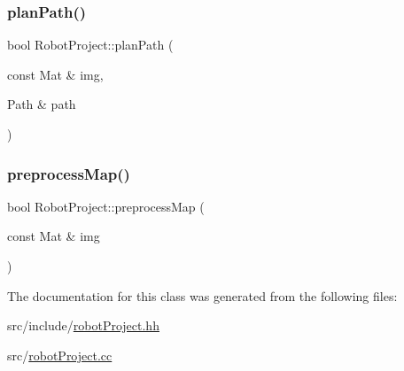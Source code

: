 \mbox{\label{class_robot_project_ad9077931a89d2226e6675c6107adfc53}} 
\subsubsection{\texorpdfstring{planPath()}{planPath()}}
{\footnotesize\ttfamily bool Robot\+Project\+::plan\+Path (\begin{DoxyParamCaption}\item[{const Mat \&}]{img,  }\item[{Path \&}]{path }\end{DoxyParamCaption})}

\mbox{\label{class_robot_project_a380adb448f0fcbc625df9401de3bb013}} 
\subsubsection{\texorpdfstring{preprocessMap()}{preprocessMap()}}
{\footnotesize\ttfamily bool Robot\+Project\+::preprocess\+Map (\begin{DoxyParamCaption}\item[{const Mat \&}]{img }\end{DoxyParamCaption})}



The documentation for this class was generated from the following files\+:\begin{DoxyCompactItemize}
\item 
src/include/\mbox{\hyperlink{robot_project_8hh}{robot\+Project.\+hh}}\item 
src/\mbox{\hyperlink{robot_project_8cc}{robot\+Project.\+cc}}\end{DoxyCompactItemize}
